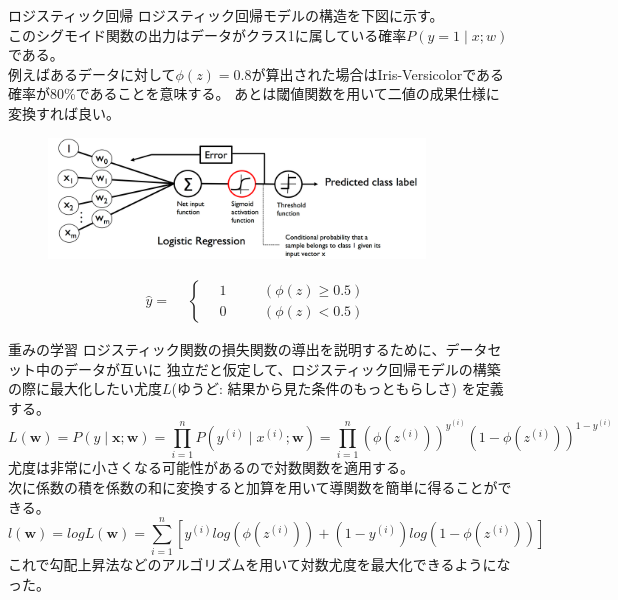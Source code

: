\documentclass[aspectratio=169, dvipdfmx, 11pt]{beamer} %
\begin{document}
\begin{frame}{ロジスティック回帰}
    ロジスティック回帰モデルの構造を下図に示す。 \\
    このシグモイド関数の出力はデータがクラス1に属している確率\(P(y=1 \mid x;w)\)である。 \\
    例えばあるデータに対して\(\phi(z)=0.8\)が算出された場合はIris-Versicolorである確率が80\%であることを意味する。
    あとは閾値関数を用いて二値の成果仕様に変換すれば良い。
    \begin{figure}[b]
        \begin{center}
        \includegraphics[width=100mm]{img/day02/fig03.png}
        \end{center}
    \end{figure}
    \begin{equation*}
        \hat{y} = 
        \begin{aligned}
            & \left\{ \,
                \begin{aligned}
                    & 1 & \quad &(\phi(z) \geq 0.5) \\
                    & 0 & \quad &(\phi(z) < 0.5)
                \end{aligned}
            \right.
        \end{aligned}
    \end{equation*}
\end{frame}

\begin{frame}{重みの学習}
    ロジスティック関数の損失関数の導出を説明するために、データセット中のデータが互いに
    独立だと仮定して、ロジスティック回帰モデルの構築の際に最大化したい尤度\(L\)(ゆうど: 結果から見た条件のもっともらしさ)
    を定義する。
    \begin{equation*}
        L(\bm{w}) = P(y \mid \bm{x};\bm{w})
        = \prod_{i=1}^n P(y^{(i)} \mid x^{(i)};\bm{w})
        = \prod_{i=1}^n (\phi (z^{(i)}))^{y^{(i)}} (1-\phi (z^{(i)}))^{1-y^{(i)}}
    \end{equation*}
    尤度は非常に小さくなる可能性があるので対数関数を適用する。\\
    次に係数の積を係数の和に変換すると加算を用いて導関数を簡単に得ることができる。
    \begin{equation*}
        l(\bm{w}) = logL(\bm{w})
        = \sum_{i=1}^{n} [y^{(i)} log(\phi (z^{(i)})) + (1-y^{(i)})log(1-\phi (z^{(i)}))]
    \end{equation*}
    これで勾配上昇法などのアルゴリズムを用いて対数尤度を最大化できるようになった。
\end{frame}
\end{document}
